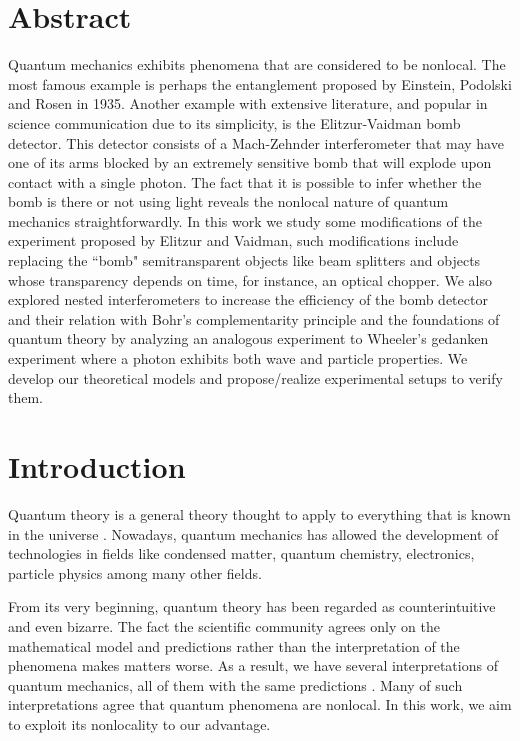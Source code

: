 \documentclass[12pt]{book}
\newcommand\blankpage{
    \null
    \thispagestyle{empty}
    \addtocounter{page}{0}
    \newpage
    }
\begin{document}
\chapter*{Abstract}
\thispagestyle{plain}
Quantum mechanics exhibits phenomena that are considered to be nonlocal. The most famous example is perhaps the entanglement proposed by Einstein, Podolski and Rosen in 1935. Another example with extensive literature, and popular in science communication due to its simplicity, is the Elitzur-Vaidman bomb detector. This detector consists of a Mach-Zehnder interferometer that may have one of its arms blocked by an extremely sensitive bomb that will explode upon contact with a single photon. The fact that it is possible to infer whether the bomb is there or not using light reveals the nonlocal nature of quantum mechanics straightforwardly. In this work we study some modifications of the experiment proposed by Elitzur and Vaidman, such modifications include replacing the ``bomb" semitransparent objects like beam splitters and objects whose transparency depends on time, for instance, an optical chopper. We also explored nested interferometers to increase the efficiency of the bomb detector and their relation with Bohr's complementarity principle and the foundations of quantum theory by analyzing an analogous experiment to Wheeler's gedanken experiment where a photon exhibits both wave and particle properties. We develop our theoretical models and propose/realize experimental setups to verify them. 


\pagebreak


\blankpage{}

\chapter*{Introduction}
\thispagestyle{plain}

Quantum theory is a general theory thought to apply to everything that is known in the universe \cite{balentine}. Nowadays, quantum mechanics has allowed the development of technologies in fields like condensed matter, quantum chemistry, electronics, particle physics among many other fields.

From its very beginning, quantum theory has been regarded as counterintuitive and even bizarre. The fact the scientific community agrees only on the mathematical model and predictions rather than the interpretation of the phenomena makes matters worse. As a result, we have several interpretations of quantum mechanics, all of them with the same predictions \cite{interpre}. Many of such interpretations agree that quantum phenomena are nonlocal. In this work, we aim to exploit its nonlocality to our advantage.
\end{document}
